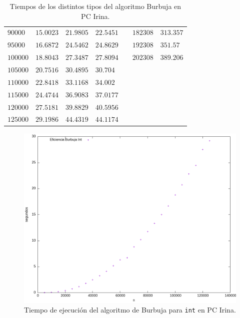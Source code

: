 \documentclass[12pt]{article}
\begin{document}
\begin{table}
\begin{tabular}{|l|l|l|l||l||l|l|}
            $90000$ & $15.0023$ & $21.9805$ & $22.5451$ & & $182308$ & $313.357$ \\
            $95000$ & $16.6872$ & $24.5462$ & $24.8629$ & & $192308$ & $351.57$ \\
            $100000$ & $18.8043$ & $27.3487$ & $27.8094$ & & $202308$ & $389.206$ \\
            $105000$ & $20.7516$ & $30.4895$ & $30.704$ & & & \\
            $110000$ & $22.8418$ & $33.1168$ & $34.002$ & & & \\
            $115000$ & $24.4744$ & $36.9083$ & $37.0177$ & & & \\
            $120000$ & $27.5181$ & $39.8829$ & $40.5956$ & & & \\
            $125000$ & $29.1986$ & $44.4319$ & $44.1174$ & & & \\
            \hline
        \end{tabular}
        \caption{Tiempos de los distintos tipos del algoritmo Burbuja en PC Irina.}
        \label{tab:burbuja}
    \end{table}
    \begin{figure}
        \centering
        \includegraphics[width=0.8\linewidth]{images/Burbuja/graficos/int.png}
        \cprotect\caption{Tiempo de ejecución del algoritmo de Burbuja para \verb|int| en PC Irina.}
        \label{fig:Burbuja_int_graf}
    \end{figure}  
\end{document}
